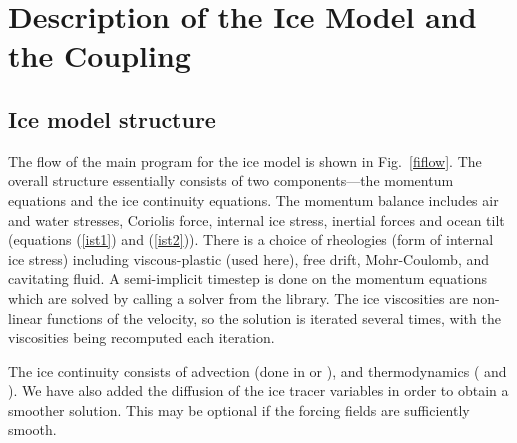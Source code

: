 \section{Description of the Ice Model and the Coupling}
\label{Userice}

\subsection{Ice model structure}
The flow of the main program for the ice model is shown in
Fig.\ \ref{fiflow}.  The overall structure essentially consists of two
components---the momentum equations and the ice continuity equations.
The momentum balance includes air and water stresses, Coriolis force,
internal ice stress, inertial forces and ocean tilt (equations
(\ref{ist1}) and (\ref{ist2})).  There is a choice of rheologies (form
of internal ice stress) including viscous-plastic (used here), free
drift, Mohr-Coulomb, and cavitating fluid.  A semi-implicit timestep is
done on the momentum equations which are solved by calling a solver
from the  library.  The ice viscosities are non-linear
functions of the velocity, so the solution is iterated several times,
with the viscosities being recomputed each iteration.

The ice continuity consists of advection (done in  or
), and thermodynamics ( and
).
We have also added the diffusion of the ice tracer variables in
order to obtain a smoother solution. This may be optional if the
forcing fields are sufficiently smooth.

